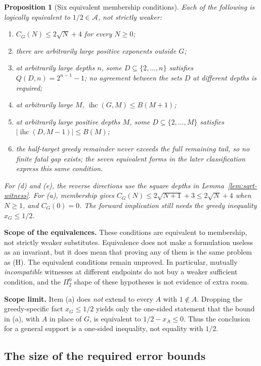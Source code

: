 \documentclass[11pt]{article}
\theoremstyle{plain}
\newtheorem{prop}[thm]{Proposition}
\theoremstyle{definition}
\theoremstyle{remark}
\begin{document}
\begin{prop}[Six equivalent membership conditions]
\label{prop:collapsed-list}
Each of the following is logically \emph{equivalent} to $1/2 \in \mathcal{A}$, not strictly weaker:
\begin{enumerate}[nosep,label=(\alph*)]
\item $C_G(N)\le2\sqrt N+4$ for every $N\ge0$;
\item there are arbitrarily large positive exponents outside $G$;
\item at arbitrarily large depths $n$, some $D\subseteq\{2,\ldots,n\}$
  satisfies $Q(D,n)=2^{n-1}-1$;
  no agreement between the sets $D$ at different depths is required;
\item at arbitrarily large $M$,
  $\operatorname{ihc}(G,M)\le B(M+1)$;
\item at arbitrarily large positive depths $M$, some
  $D\subseteq\{2,\ldots,M\}$ satisfies
  $|\operatorname{ihc}(D,M-1)|\le B(M)$;
\item the half-target greedy remainder never exceeds the full remaining
  tail, so no finite fatal gap exists; the seven equivalent
  forms in the later classification express this same condition.
\end{enumerate}
For (d) and (e), the reverse directions use the square depths in
Lemma~\ref{lem:sqrt-witness}.
For (a), membership gives
$C_G(N)\le2\sqrt{N+1}+3\le2\sqrt N+4$ when $N\ge1$, and $C_G(0)=0$.
The forward implication still needs the greedy inequality $x_G\le1/2$.
\end{prop}

\textbf{Scope of the equivalences.} These conditions are equivalent to membership, not strictly
weaker substitutes. Equivalence does not make a formulation useless as an invariant, but it does
mean that proving any of them is the same problem as (H). The equivalent conditions remain
unproved. In particular, mutually \emph{incompatible} witnesses at different endpoints do not buy
a weaker sufficient condition, and the $\Pi^0_2$ shape of these hypotheses is not evidence of extra
room.

\textbf{Scope limit.} Item (a) does \emph{not} extend to every $A$ with
$1 \notin A$. Dropping the greedy-specific fact $x_G \le 1/2$ yields only the one-sided statement
that the bound in (a), with $A$ in place of $G$, is equivalent to $1/2 - x_A \le 0$. Thus the conclusion for a general support is a one-sided inequality,
not equality with $1/2$.

\subsection{The size of the required error bounds}
\label{bar:scale}
\end{document}
